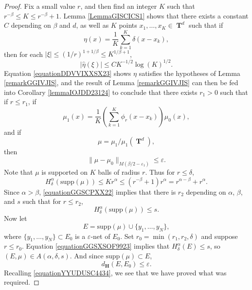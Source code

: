 \documentclass[12pt,reqno]{article}
\numberwithin{equation}{section}
\DeclareMathOperator{\TT}{\mathbf{T}}
\numberwithin{theorem}{section}
\begin{document}
\begin{proof}
    Fix a small value $r$, and then find an integer $K$ such that $r^{-\beta} \leq K \leq r^{-\beta} + 1$. Lemma \ref{LemmaGISCICS1} shows that there exists a constant $C$ depending on $\beta$ and $d$, as well as $K$ points $x_1, \dots, x_K \in \TT^d$ such that if
    \[ \eta(x) = \frac{1}{K} \sum_{k = 1}^K \delta(x - x_k), \]
    then for each $|\xi| \leq (1/r)^{1 + 1/\beta} \leq K^{1/\beta + 1}$,
    \begin{equation} \label{equationDDVVIXXSX23}
        |\widehat{\eta}(\xi)| \leq C K^{-1/2} \log(K)^{1/2}.
    \end{equation}
    Equation \eqref{equationDDVVIXXSX23} shows $\eta$ satisfies the hypotheses of Lemma \ref{remarkGGIVJIS}, and the result of Lemma \ref{remarkGGIVJIS} can then be fed into Corollary \ref{lemmaIOJDD23124} to conclude that there exists $r_1 > 0$ such that if $r \leq r_1$, if
    \[ \mu_1(x) = \frac{1}{K} \left( \sum_{k = 1}^K \phi_{r}(x - x_k) \right) \mu_0(x), \]
    and if
    \[ \mu = \mu_1 / \mu_1(\TT^d), \]
    then
    \begin{equation} \label{equationYYUDUSC4434}
        \| \mu - \mu_0 \|_{M(\beta/2 - \varepsilon_1)} \leq \varepsilon.
    \end{equation}
    Note that $\mu$ is supported on $K$ balls of radius $r$. Thus for $r \leq \delta$,
    \begin{equation} \label{equationGGSCPXX22}
        H^\alpha_\delta(\text{supp}(\mu)) \leq K r^\alpha \leq (r^{-\beta} + 1) r^\alpha = r^{\alpha - \beta} + r^\alpha.
    \end{equation}
    Since $\alpha > \beta$, \eqref{equationGGSCPXX22} implies that there is $r_2$ depending on $\alpha$, $\beta$, and $s$ such that for $r \leq r_2$,
    \begin{equation} \label{equationGGSXSOF9923}
        H^\alpha_\delta(\text{supp}(\mu)) \leq s.
    \end{equation}
    Now let
    \[ E = \text{supp}(\mu) \cup \{ y_1, \dots, y_N \}, \]
    where $\{ y_1, \dots, y_N \} \subset E_0$ is a $\varepsilon$-net of $E_0$. Set $r_0 = \min(r_1,r_2, \delta)$ and suppose $r \leq r_0$. Equation \eqref{equationGGSXSOF9923} implies that $H^\alpha_\delta(E) \leq s$, so $(E,\mu) \in A(\alpha,\delta,s)$. And since $\text{supp}(\mu) \subset E$,
    \begin{equation} \label{equationGGISIICV222}
        d_\mathbf{H}(E,E_0) \leq \varepsilon.
    \end{equation}
    Recalling \eqref{equationYYUDUSC4434}, we see that we have proved what was required.
\end{proof}
\end{document}

